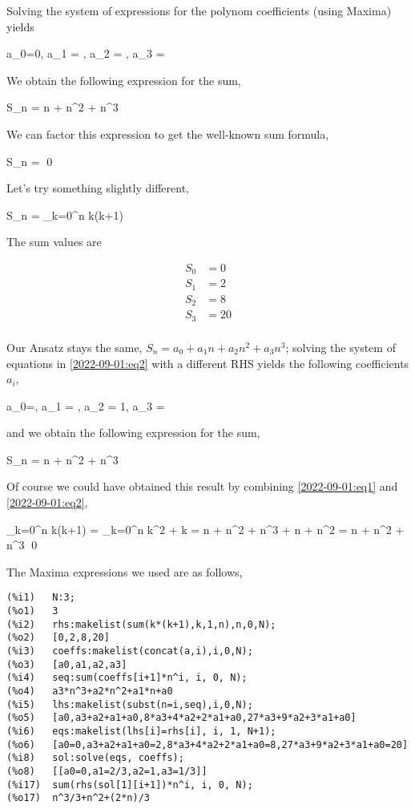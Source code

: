 Solving the system of expressions for the polynom coefficients (using Maxima) yields

\bee
a_0=0, a_1 = , a_2 = , a_3 = 
\eee

We obtain the following expression for the sum,

\be\label{2022-09-01:eq3}
S_n = n + n^2 + n^3
\ee

We can factor this expression to get the well-known sum formula,

\bee
S_n =  \qed
\eee

Let's try something slightly different,

\bee
S_n = \sum_{k=0}^n k(k+1)
\eee

The sum values are

\begin{align*}
  S_0 &= 0 \\
  S_1 &= 2 \\
  S_2 &= 8 \\
  S_3 &= 20 \\
\end{align*}

Our Ansatz stays the same, $S_n = a_0 + a_1 n + a_2 n^2 + a_3 n^3$; solving the system of equations in \eqref{2022-09-01:eq2} with a different RHS yields the following coefficients $a_i$,

\bee
a_0=, a_1 = , a_2 = 1, a_3 = 
\eee

and we obtain the following expression for the sum,

\bee
S_n = n + n^2 + n^3
\eee

Of course we could have obtained this result by combining \eqref{2022-09-01:eq1} and \eqref{2022-09-01:eq2},

\bee
\sum_{k=0}^n k(k+1) = \sum_{k=0}^n k^2 + k = n + n^2 + n^3 + n + n^2 = n + n^2 + n^3 \qed
\eee

The Maxima expressions we used are as follows,

\begin{verbatim}
(%i1)	N:3;
(%o1)	3
(%i2)	rhs:makelist(sum(k*(k+1),k,1,n),n,0,N);
(%o2)	[0,2,8,20]
(%i3)	coeffs:makelist(concat(a,i),i,0,N);
(%o3)	[a0,a1,a2,a3]
(%i4)	seq:sum(coeffs[i+1]*n^i, i, 0, N);
(%o4)	a3*n^3+a2*n^2+a1*n+a0
(%i5)	lhs:makelist(subst(n=i,seq),i,0,N);
(%o5)	[a0,a3+a2+a1+a0,8*a3+4*a2+2*a1+a0,27*a3+9*a2+3*a1+a0]
(%i6)	eqs:makelist(lhs[i]=rhs[i], i, 1, N+1);
(%o6)	[a0=0,a3+a2+a1+a0=2,8*a3+4*a2+2*a1+a0=8,27*a3+9*a2+3*a1+a0=20]
(%i8)	sol:solve(eqs, coeffs);
(%o8)	[[a0=0,a1=2/3,a2=1,a3=1/3]]
(%i17)	sum(rhs(sol[1][i+1])*n^i, i, 0, N);
(%o17)	n^3/3+n^2+(2*n)/3
\end{verbatim}


